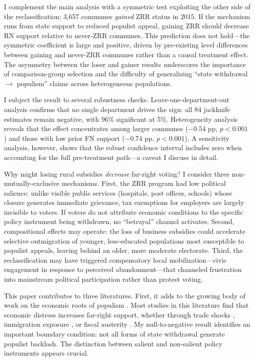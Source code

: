\documentclass[12pt]{article}
\begin{document}
I complement the main analysis with a symmetric test exploiting the other side of the reclassification: 3,657 communes \textit{gained} ZRR status in 2015. If the mechanism runs from state support to reduced populist appeal, gaining ZRR should decrease RN support relative to never-ZRR communes. This prediction does not hold---the symmetric coefficient is large and positive, driven by pre-existing level differences between gaining and never-ZRR communes rather than a causal treatment effect. The asymmetry between the loser and gainer results underscores the importance of comparison-group selection and the difficulty of generalizing ``state withdrawal $\to$ populism'' claims across heterogeneous populations.

I subject the result to several robustness checks. Leave-one-department-out analysis confirms that no single department drives the sign: all 84 jackknife estimates remain negative, with 96\% significant at 5\%. Heterogeneity analysis reveals that the effect concentrates among larger communes ($-0.54$ pp, $p < 0.001$) and those with low prior FN support ($-0.74$ pp, $p < 0.001$). A \citet{rambachan2023more} sensitivity analysis, however, shows that the robust confidence interval includes zero when accounting for the full pre-treatment path---a caveat I discuss in detail.

Why might losing rural subsidies \textit{decrease} far-right voting? I consider three non-mutually-exclusive mechanisms. First, the ZRR program had low political salience: unlike visible public services (hospitals, post offices, schools) whose closure generates immediate grievance, tax exemptions for employers are largely invisible to voters. If voters do not attribute economic conditions to the specific policy instrument being withdrawn, no ``betrayal'' channel activates. Second, compositional effects may operate: the loss of business subsidies could accelerate selective outmigration of younger, less-educated populations most susceptible to populist appeals, leaving behind an older, more moderate electorate. Third, the reclassification may have triggered compensatory local mobilization---civic engagement in response to perceived abandonment---that channeled frustration into mainstream political participation rather than protest voting.

This paper contributes to three literatures. First, it adds to the growing body of work on the economic roots of populism \citep{rodrik2021populism, guriev2022populism, funke2016populism, algan2017great}. Most studies in this literature find that economic distress increases far-right support, whether through trade shocks \citep{autor2020importing, colantone2018trade, dippel2022effect}, immigration exposure \citep{dustmann2017refugee, halla2017immigration, edo2019immigration, caselli2021immigration}, or fiscal austerity \citep{fetzer2019austerity, dal2019fiscal}. My null-to-negative result identifies an important boundary condition: not all forms of state withdrawal generate populist backlash. The distinction between salient and non-salient policy instruments appears crucial.
\end{document}
